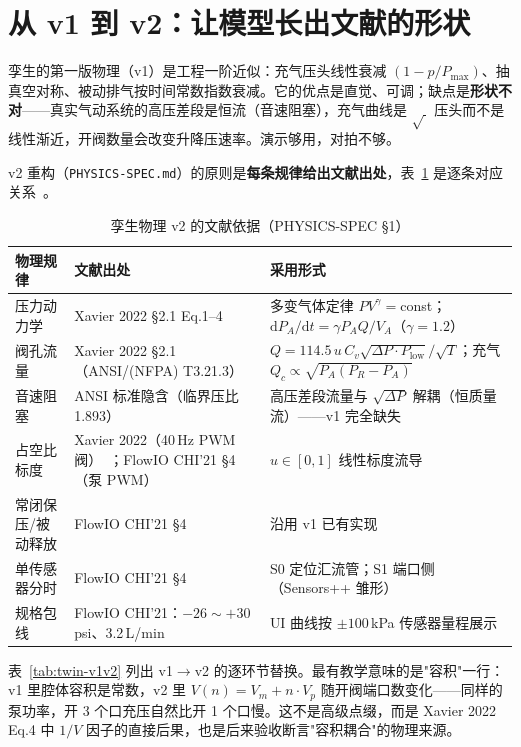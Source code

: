 \section{从 v1 到 v2：让模型长出文献的形状}
\label{sec:twin-v2}

孪生的第一版物理（v1）是工程一阶近似：充气压头线性衰减 $(1-p/P_\text{max})$、抽真空对称、被动排气按时间常数指数衰减。它的优点是直觉、可调；缺点是\textbf{形状不对}——真实气动系统的高压差段是恒流（音速阻塞），充气曲线是 $\sqrt{\ }$ 压头而不是线性渐近，开阀数量会改变升降压速率。演示够用，对拍不够。

v2 重构（\texttt{PHYSICS-SPEC.md}）的原则是\textbf{每条规律给出文献出处}，表~\ref{tab:twin-lit} 是逐条对应关系~\cite{Xavier2020AIM,Xavier2022Frontiers}。

\begin{table}[htbp]
  \centering
  \caption{孪生物理 v2 的文献依据（PHYSICS-SPEC \S1）}
  \label{tab:twin-lit}
  \begin{tabular}{lp{5.6cm}p{4.9cm}}
    \toprule
    物理规律 & 文献出处 & 采用形式 \\
    \midrule
    压力动力学 & Xavier 2022 \S2.1 Eq.1--4~\cite{Xavier2022Frontiers} & 多变气体定律 $PV^\gamma{=}$const；$\mathrm{d}P_A/\mathrm{d}t=\gamma P_A Q/V_A$（$\gamma{=}1.2$） \\
    阀孔流量 & Xavier 2022 \S2.1（ANSI/(NFPA) T3.21.3） & $Q=114.5\,u\,C_v\sqrt{\Delta P \cdot P_\text{low}}/\sqrt{T}$；充气 $Q_c\propto\sqrt{P_A(P_R-P_A)}$ \\
    音速阻塞 & ANSI 标准隐含（临界压比 1.893） & 高压差段流量与 $\sqrt{\Delta P}$ 解耦（恒质量流）——v1 完全缺失 \\
    占空比标度 & Xavier 2022（40\,Hz PWM 阀）~\cite{Xavier2022Frontiers}；FlowIO CHI'21 \S4（泵 PWM）~\cite{Shtarbanov2021} & $u\in[0,1]$ 线性标度流导 \\
    常闭保压/被动释放 & FlowIO CHI'21 \S4 & 沿用 v1 已有实现 \\
    单传感器分时 & FlowIO CHI'21 \S4 & S0 定位汇流管；S1 端口侧（Sensors++ 雏形） \\
    规格包线 & FlowIO CHI'21：$-26\sim+30$\,psi、3.2\,L/min & UI 曲线按 $\pm100$\,kPa 传感器量程展示 \\
    \bottomrule
  \end{tabular}
\end{table}

表~\ref{tab:twin-v1v2} 列出 v1$\to$v2 的逐环节替换。最有教学意味的是"容积"一行：v1 里腔体容积是常数，v2 里 $V(n)=V_m+n\cdot V_p$ 随开阀端口数变化——同样的泵功率，开 3 个口充压自然比开 1 个口慢。这不是高级点缀，而是 Xavier 2022 Eq.4 中 $1/V$ 因子的直接后果，也是后来验收断言"容积耦合"的物理来源。

